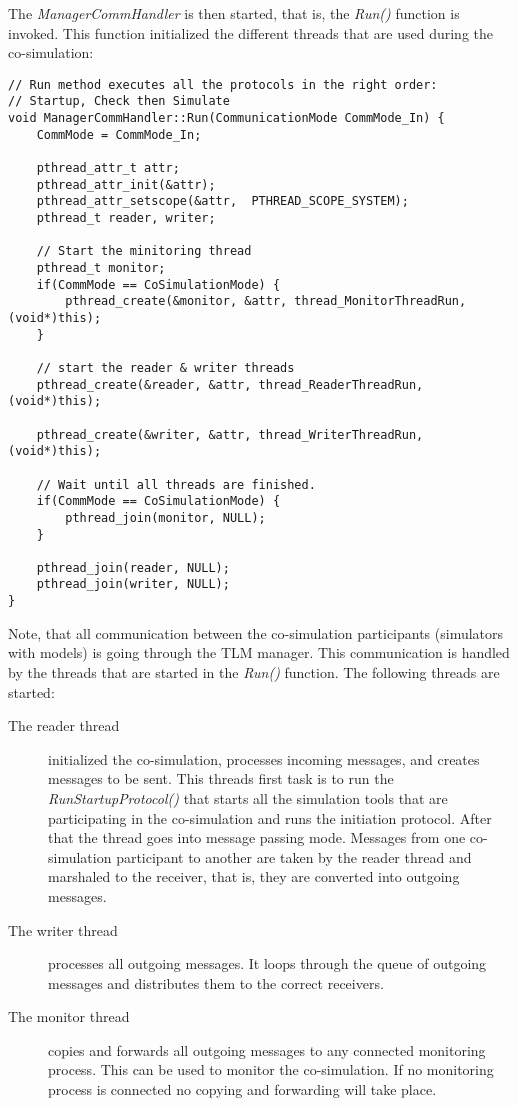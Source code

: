 The {\em ManagerCommHandler} is then started, that is, the {\em Run()} function is invoked. 
This function initialized the different threads that are used during the co-simulation:
{\scriptsize
\begin{verbatim}
// Run method executes all the protocols in the right order:
// Startup, Check then Simulate
void ManagerCommHandler::Run(CommunicationMode CommMode_In) {
    CommMode = CommMode_In;

    pthread_attr_t attr;
    pthread_attr_init(&attr);
    pthread_attr_setscope(&attr,  PTHREAD_SCOPE_SYSTEM);
    pthread_t reader, writer;

    // Start the minitoring thread
    pthread_t monitor;
    if(CommMode == CoSimulationMode) {
        pthread_create(&monitor, &attr, thread_MonitorThreadRun, (void*)this);
    }

    // start the reader & writer threads
    pthread_create(&reader, &attr, thread_ReaderThreadRun, (void*)this);

    pthread_create(&writer, &attr, thread_WriterThreadRun, (void*)this);

    // Wait until all threads are finished.
    if(CommMode == CoSimulationMode) {
        pthread_join(monitor, NULL);
    }
    
    pthread_join(reader, NULL);
    pthread_join(writer, NULL);
}
\end{verbatim}
}

Note, that all communication between the co-simulation participants (simulators with models) is going through the TLM manager. 
This communication is handled by the threads that are started in the {\em Run()} function. 
The following threads are started:
\begin{description}
\item[The reader thread] initialized the co-simulation, processes incoming messages, and creates messages to be sent. 
This threads first task is to run the {\em RunStartupProtocol()} that starts all the simulation tools that are participating in the co-simulation and runs the initiation protocol. 
After that the thread goes into message passing mode. 
Messages from one co-simulation participant to another are taken by the reader thread and marshaled to the receiver, that is, they are converted into outgoing messages.
\item[The writer thread] processes all outgoing messages. 
It loops through the queue of outgoing messages and distributes them to the correct receivers.
\item[The monitor thread] copies and forwards all outgoing messages to any connected monitoring process. 
This can be used to monitor the co-simulation. 
If no monitoring process is connected no copying and forwarding will take place.
\end{description}

